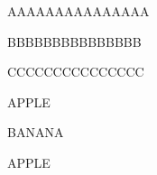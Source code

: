 \documentclass[12pt]{article}
\begin{document}


\begin{center}
    AAAAAAAAAAAAAAA
\end{center}


BBBBBBBBBBBBBBB


\begin{Large}
    CCCCCCCCCCCCCCC
\end{Large}


\begin{center}
    APPLE

    \begin{Large}
        BANANA
    \end{Large}

    APPLE
\end{center}
\end{document}
